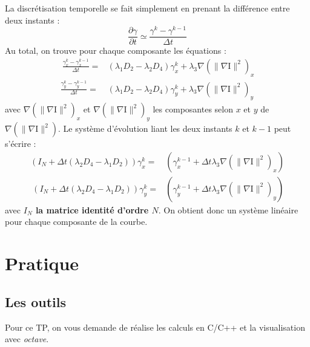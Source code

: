 \documentclass[10pt,a4paper]{article}
\begin{document}
La discr\'{e}tisation temporelle se fait simplement en prenant la diff\'{e}rence entre deux instants : 
\begin{displaymath}
	\frac{\partial \gamma}{\partial t} \simeq \frac{\gamma^{k}-\gamma^{k-1}}{\Delta t}
\end{displaymath}
Au total, on trouve pour chaque composante les \'{e}quations : 
\begin{eqnarray}~\label{discreteSnake}
	\frac{\gamma_{x}^{k}-\gamma_{x}^{k-1}}{\Delta t}=& (\lambda_1 D_2 -\lambda_2 D_4)\gamma_{x}^{k} + \lambda_3 \nabla(\|\nabla \text{I}\|^2)_{x}\\
	\frac{\gamma_{y}^{k}-\gamma_{y}^{k-1}}{\Delta t}=& (\lambda_1 D_2 -\lambda_2 D_4)\gamma_{y}^{k} + \lambda_3 \nabla(\|\nabla \text{I}\|^2)_{y}
\end{eqnarray}
avec $\nabla(\|\nabla \text{I}\|^2)_{x}$ et $\nabla(\|\nabla \text{I}\|^2)_{y}$ les composantes selon $x$ et $y$ de $\nabla(\|\nabla \text{I}\|^2)$. Le syst\`{e}me d'\'{e}volution liant les deux instants $k$ et $k-1$ peut s'\'{e}crire : 
\begin{eqnarray}\label{evolutionSnakex}
	(I_N+\Delta t (\lambda_2 D_4 - \lambda_1 D_2)) \gamma_{x}^{k} =&  (\gamma_{x}^{k-1} + \Delta t  \lambda_3 \nabla(\|\nabla \text{I}\|^2)_{x} )\\
~\label{evolutionSnakey}
	(I_N+\Delta t (\lambda_2 D_4 - \lambda_1 D_2)) \gamma_{y}^{k} =&  (\gamma_{y}^{k-1} + \Delta t  \lambda_3 \nabla(\|\nabla \text{I}\|^2)_{y} )
\end{eqnarray}
avec \textbf{$I_N$ la matrice identit\'{e} d'ordre $N$}. On obtient donc un syst\`{e}me lin\'{e}aire pour chaque composante de la courbe.



\clearpage
\section{Pratique}
\subsection{Les outils}
Pour ce TP, on vous demande de r\'{e}alise les calculs en C/C++ et la visualisation avec \textit{octave}.
\end{document}
